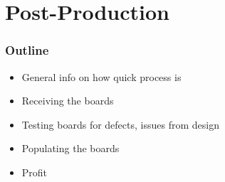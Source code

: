 \documentclass[]{beamer}
\begin{document}
\section[Post-Production]{Post-Production}
\begin{frame}
    \frametitle{\insertsection{} Outline}
    \begin{itemize}
        \item General info on how quick process is
        \item Receiving the boards
        \item Testing boards for defects, issues from design
        \item Populating the boards
        \item Profit
    \end{itemize}
\end{frame}
\end{document}
